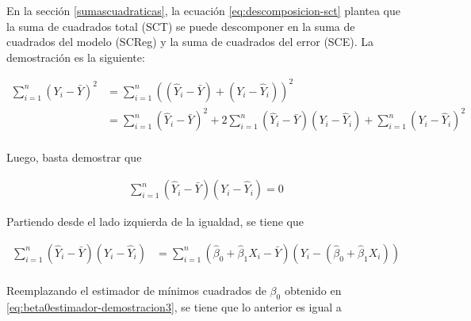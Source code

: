 \documentclass[
  11pt,
]{book}
\theoremstyle{definition}
\theoremstyle{definition}
\theoremstyle{definition}
\theoremstyle{definition}
\theoremstyle{remark}
\begin{document}
En la sección \ref{sumascuadraticas}, la ecuación \eqref{eq:descomposicion-sct} plantea que la suma de cuadrados total (SCT) se puede descomponer en la suma de cuadrados del modelo (SCReg) y la suma de cuadrados del error (SCE). La demostración es la siguiente:

\begin{equation}
\begin{split}
\sum_{i=1}^n\left( Y_i - \bar{Y} \right)^2 &= \sum_{i=1}^n\left( \left( \widehat{Y}_i - \bar{Y} \right) + \left( Y_i - \widehat{Y}_i \right) \right)^2\\
&= \sum_{i=1}^n\left( \widehat{Y}_i - \bar{Y} \right)^2  + 2\sum_{i=1}^n\left( \widehat{Y}_i - \bar{Y} \right)\left( Y_i - \widehat{Y}_i \right) + \sum_{i=1}^n\left( Y_i - \widehat{Y}_i \right)^2\\
\end{split}
\label{eq:demostracionSCT1}
\end{equation}

Luego, basta demostrar que

\begin{equation}
\begin{split}
\sum_{i=1}^n\left( \widehat{Y}_i - \bar{Y} \right)\left( Y_i - \widehat{Y}_i \right) = 0
\end{split}
\label{eq:demostracionSCT2}
\end{equation}

Partiendo desde el lado izquierda de la igualdad, se tiene que

\begin{equation}
\begin{split}
\sum_{i=1}^n\left( \widehat{Y}_i - \bar{Y} \right)\left( Y_i - \widehat{Y}_i \right) &= \sum_{i=1}^n\left( \widehat{\beta}_0 + \widehat{\beta}_1X_i - \bar{Y} \right)\left( Y_i - \left( \widehat{\beta}_0 + \widehat{\beta}_1X_i \right) \right)\\
\end{split}
\label{eq:demostracionSCT3}
\end{equation}

Reemplazando el estimador de mínimos cuadrados de \(\beta_0\) obtenido en \eqref{eq:beta0estimador-demostracion3}, se tiene que lo anterior es igual a
\end{document}
